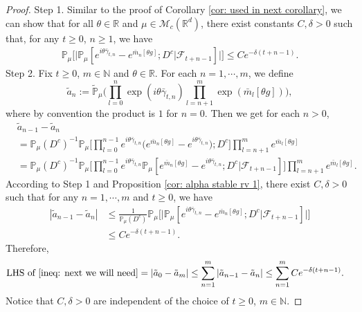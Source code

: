 \documentclass[12pt,a4paper]{amsart}
\theoremstyle{plain}
\theoremstyle{definition}
\numberwithin{equation}{section}
\begin{document}
\begin{proof}
Step 1. Similar to the proof of Corollary \ref{cor: used in next corollary}, we can show that  for all $\theta\in \mathbb{R}$ and $\mu\in \mathcal{M}_c(\mathbb{R}^d)$, there exist constants $C,\delta>0$ such that, for any $t\geq 0$, $n\geq 1$, we have
\begin{align}
    \mathbb{P}_{\mu}\Big[\big|\mathbb{P}_{\mu}[e^{i\theta\bar{\gamma}_{t,n}}-e^{\bar{m}_n[\theta g]}; D^c | \mathscr F_{t+n-1}]\big|\Big]\leq Ce^{-\delta(t+n-1)}.
\end{align}
Step 2.   Fix $t\geq 0$, $m\in \mathbb{N}$ and $\theta\in \mathbb{R}$.
    For each $n=1,\cdots,m$, we define
    \[\tilde{a}_n:=\mathbb{\tilde{P}}_{\mu}\Big(\prod_{l=0}^{n}\exp\left(i\theta\bar{\gamma}_{t,n}\right)\prod_{l=n+1}^{m}\exp(\bar{m}_l[\theta g])\Big),\]
     where by convention the product is $1$ for $n=0$. Then we get for each $n > 0$,
    \begin{align*}
        &\tilde{a}_{n-1} - \tilde{a}_n
        \\&=\mathbb{P}_{\mu}(D^c)^{-1}\mathbb{P}_{\mu}\Big[\prod_{l=0}^{n-1}e^{i\theta\bar{\gamma}_{t,n}}\Big(e^{\bar{m}_n[\theta g]}-e^{i\theta \bar{\gamma}_{t,n}}\Big);D^c\Big]\prod_{l=n+1}^{m}e^{\bar{m}_l[\theta g]}
        \\&=\mathbb{P}_{\mu}(D^c)^{-1}\mathbb{P}_{\mu}\Big[\prod_{l=0}^{n-1}e^{i\theta\bar{\gamma}_{t,n}}\mathbb{P}_{\mu}[e^{\bar{m}_n[\theta g]}-e^{i\theta \bar{\gamma}_{t,n}};D^c|\mathscr{F}_{t+n-1}]\Big]\prod_{l=n+1}^{m}e^{\bar{m}_l[\theta g]}.
    \end{align*}
   According to Step 1 and Proposition \ref{cor: alpha stable rv 1},
    there exist $C,\delta>0$ such that for any $n=1,\cdots, m$ and $t\geq0$, we have
    \begin{align*}
        |\tilde{a}_{n-1}- \tilde{a}_n|
        &\leq \frac{1}{\mathbb{P}_{\mu}(D^c)}\mathbb{P}_{\mu}\Big[\big|\mathbb P_\mu[e^{i\theta\bar{\gamma}_{t,n}}-e^{\bar{m}_n[\theta g]}; D^c\big|\mathscr{F}_{t+n-1}]\big|\Big]
        \\& \leq C e^{-\delta(t+n-1)}.
    \end{align*}
Therefore,
\begin{align}
    \text{LHS of \eqref{ineq: next we will need}}&= \left|\tilde{a}_{0}-\tilde{a}_m\right|
    \leq\sum_{n=1}^m\left|\tilde{a}_{n-1}-\tilde{a}_n\right|
    \leq \sum_{n=1}^m C e^{-\delta(t+n-1)}.
\end{align}
	Notice that $C, \delta>0$ are independent of the choice of $t\geq 0$, $m\in \mathbb{N}$.
\end{proof}
\end{document}

